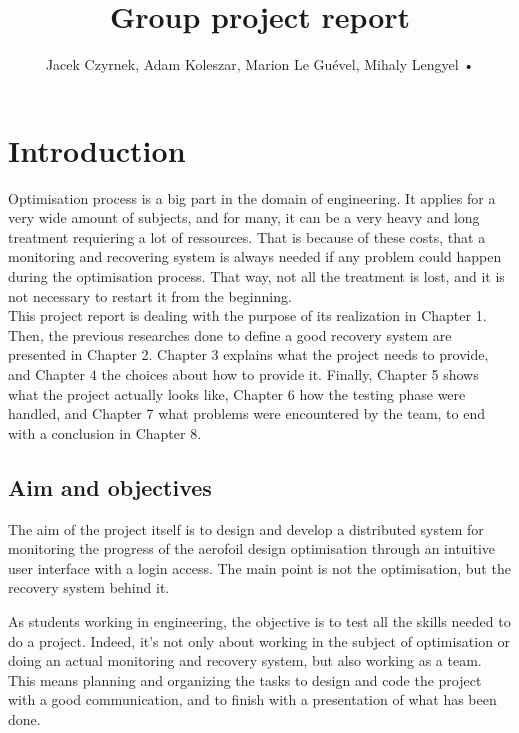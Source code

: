 \documentclass[10pt,a4paper]{report}
\author{Jacek Czyrnek, Adam Koleszar, Marion Le Guével, Mihaly Lengyel
•
}
\title{Group project report}
\begin{document}
\maketitle
\tableofcontents

\chapter{Introduction}
Optimisation process is a big part in the domain of engineering. It applies for a very wide amount of subjects, and for many, it can be a very heavy and long treatment requiering a lot of ressources. That is because of these costs, that a monitoring and recovering system is always needed if any problem could happen during the optimisation process. That way, not all the treatment is lost, and it is not necessary to restart it from the beginning.\\

This project report is dealing with the purpose of its realization in Chapter 1. Then, the previous researches done to define a good recovery system are presented in Chapter 2. Chapter 3 explains what the project needs to provide, and Chapter 4 the choices about how to provide it. Finally, Chapter 5 shows what the project actually looks like, Chapter 6 how the testing phase were handled, and Chapter 7 what problems were encountered by the team, to end with a conclusion in Chapter 8.\\

	\section{Aim and objectives}
The aim of the project itself is to design and develop a distributed system for monitoring the progress of the aerofoil design optimisation through an intuitive user interface with a login access. The main point is not the optimisation, but the recovery system behind it.

As students working in engineering, the objective is to test all the skills needed to do a project. Indeed, it's not only about working in the subject of optimisation or doing an actual monitoring and recovery system, but also working as a team. This means planning and organizing the tasks to design and code the project with a good communication, and to finish with a presentation of what has been done.
	
\end{document}
